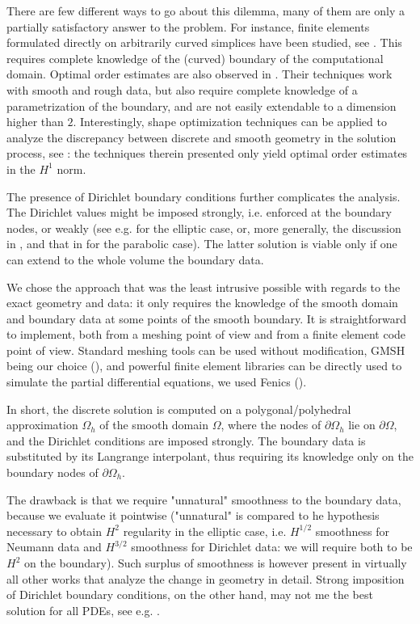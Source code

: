 \documentclass[english,a4paper,9pt,oneside]{scrbook}	%
\theoremstyle{break}
\theoremstyle{remark}
\begin{document}
\begin{appendices}
There are few different ways to go about this dilemma, many of them are only a partially satisfactory answer to the problem. For instance, finite elements formulated directly on arbitrarily curved simplices have been studied, see \cite{zlamal}. This requires complete knowledge of the (curved) boundary of the computational domain. Optimal order estimates are also observed in \cite{bramble}. Their techniques work with smooth and rough data, but also require complete knowledge of a parametrization of the boundary, and are not easily extendable to a dimension higher than $2$. Interestingly, shape optimization techniques can be applied to analyze the discrepancy between discrete and smooth geometry in the solution process, see \cite{tiihonen}: the techniques therein presented only yield optimal order estimates in the $H^1$ norm.

The presence of Dirichlet boundary conditions further complicates the analysis. The Dirichlet values might be imposed strongly, i.e. enforced at the boundary nodes, or weakly (see e.g. \cite{chiba} for the elliptic case, or, more generally, the discussion in \cite{chouly}, and that in \cite{benner} for the parabolic case). The latter solution is viable only if one can extend to the whole volume the boundary data.

We chose the approach that was the least intrusive possible with regards to the exact geometry and data: it only requires the knowledge of the smooth domain and boundary data at some points of the smooth boundary. It is straightforward to implement, both from a meshing point of view and from a finite element code point of view. Standard meshing tools can be used without modification, GMSH being our choice (\cite{gmsh}), and powerful finite element libraries can be directly used to simulate the partial differential equations, we used Fenics (\cite{fenics}).

In short, the discrete solution is computed on a polygonal/polyhedral approximation $\Omega_h$ of the smooth domain $\Omega$, where the nodes of $\partial \Omega_h$ lie on $\partial \Omega$, and the Dirichlet conditions are imposed strongly. The boundary data is substituted by its Langrange interpolant, thus requiring its knowledge only on the boundary nodes of $\partial \Omega_h$.

The drawback is that we require "unnatural" smoothness to the boundary data, because we evaluate it pointwise ("unnatural" is compared to he hypothesis necessary to obtain $H^2$ regularity in the elliptic case, i.e. $H^{1/2}$ smoothness for Neumann data and $H^{3/2}$ smoothness for Dirichlet data: we will require both to be $H^2$ on the boundary). Such surplus of smoothness is however present in virtually all other works that analyze the change in geometry in detail. Strong imposition of Dirichlet boundary conditions, on the other hand, may not me the best solution for all PDEs, see e.g. \cite{hughes}.


\end{appendices}
\end{document}
